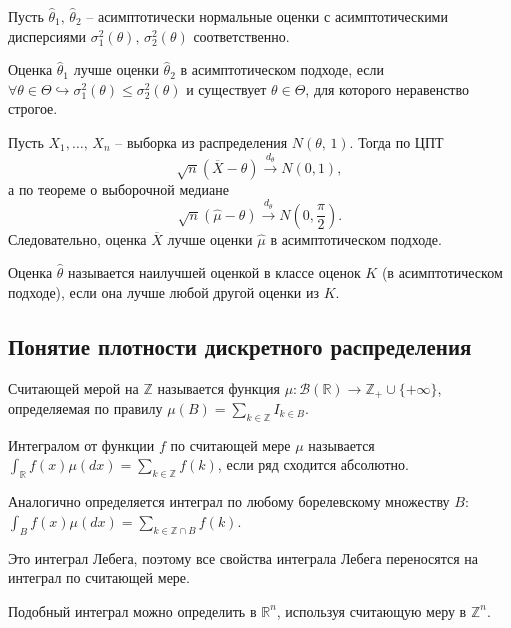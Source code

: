     Пусть $\displaystyle \hat{\theta }_{1},\, \hat{\theta }_{2}$ -- асимптотически нормальные оценки с асимптотическими дисперсиями $\displaystyle \sigma _{1}^{2}( \theta ) ,\, \sigma _{2}^{2}( \theta )$ соответственно.
    \begin{definition}
    Оценка $\displaystyle \hat{\theta }_{1}$ лучше оценки $\displaystyle \hat{\theta }_{2}$ в асимптотическом подходе, если $\displaystyle \forall \theta \in \Theta \hookrightarrow \sigma _{1}^{2}( \theta ) \leqslant \sigma _{2}^{2}( \theta )$ и существует $\displaystyle \theta \in \Theta $, для которого неравенство строгое.
    \end{definition}
    \begin{example}
    Пусть $\displaystyle X_{1} ,\dotsc ,\, X_{n}$ -- выборка из распределения $\displaystyle N( \theta,\, 1)$. Тогда по ЦПТ
    \begin{equation}
        \sqrt{n}(\overline{X} -\theta )\xrightarrow{d_{\theta }} N( 0,1),
    \end{equation}
    а по теореме о выборочной медиане
    \begin{equation}
        \sqrt{n}(\hat{\mu } -\theta )\xrightarrow{d_{\theta }} N\left( 0,\frac{\pi }{2}\right).
    \end{equation}
    Следовательно, оценка $\displaystyle \overline{X}$ лучше оценки $\displaystyle \hat{\mu }$ в асимптотическом подходе.
    \end{example}
    \begin{definition}
    Оценка $\displaystyle \hat{\theta }$ называется наилучшей оценкой в классе оценок $\displaystyle K$ (в асимптотическом подходе), если она лучше любой другой оценки из $\displaystyle K$.
    \end{definition}
    \subsection{Понятие плотности дискретного распределения}
    \begin{definition}
    Считающей мерой на $\displaystyle \mathbb{Z}$ называется функция $\displaystyle \mu :\mathcal{B}(\mathbb{R})\rightarrow \mathbb{Z}_{+} \cup \{+\infty \}$, определяемая по правилу $\displaystyle \mu ( B) =\sum _{k\in \mathbb{Z}} I_{k\in B}$.
    \end{definition}
    \begin{definition}
    Интегралом от функции $\displaystyle f$ по считающей мере $\displaystyle \mu $ называется $\displaystyle \int _{\mathbb{R}} f( x) \mu ( dx) =\sum _{k\in \mathbb{Z}} f( k)$, если ряд сходится абсолютно.
    \end{definition}
    Аналогично определяется интеграл по любому борелевскому множеству $\displaystyle B$: $\displaystyle \int _{B} f( x) \mu ( dx) =\sum _{k\in \mathbb{Z} \cap B} f( k)$.
    \begin{note}
    Это интеграл Лебега, поэтому все свойства интеграла Лебега переносятся на интеграл по считающей мере.
    \end{note}
    \begin{note}
    Подобный интеграл можно определить в $\displaystyle \mathbb{R}^{n}$, используя считающую меру в $\displaystyle \mathbb{Z}^{n}$.
    \end{note}
